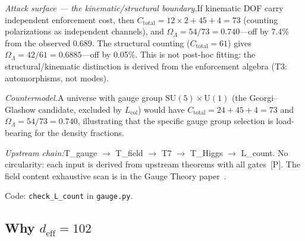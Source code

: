 \documentclass[11pt]{article}
\newcommand{\Ctot}{C_{\mathrm{total}}}
\newcommand{\OmL}{\Omega_\Lambda}
\newcommand{\Lcol}{L_{\mathrm{col}}}
\newcommand{\SU}{\mathrm{SU}}
\newcommand{\U}{\mathrm{U}}
\begin{document}
\textit{Attack surface --- the kinematic/structural boundary.}\quad If kinematic DOF carry independent enforcement cost, then $\Ctot = 12 \times 2 + 45 + 4 = 73$ (counting polarizations as independent channels), and $\OmL = 54/73 = 0.740$---off by 7.4\% from the observed 0.689.  The structural counting ($\Ctot = 61$) gives $\OmL = 42/61 = 0.6885$---off by 0.05\%.  This is not post-hoc fitting: the structural/kinematic distinction is derived from the enforcement algebra (T3: automorphisms, not modes).

\textit{Countermodel.}\quad A universe with gauge group $\SU(5) \times \U(1)$ (the Georgi--Glashow candidate, excluded by $\Lcol$) would have $\Ctot = 24 + 45 + 4 = 73$ and $\OmL = 54/73 = 0.740$, illustrating that the specific gauge group selection is load-bearing for the density fractions.

\textit{Upstream chain:}\quad T\_gauge $\to$ T\_field $\to$ T7 $\to$ T\_Higgs $\to$ L\_count.  No circularity: each input is derived from upstream theorems with all gates~[P].  The field content exhaustive scan is in the Gauge Theory paper~\cite{PGT}.

Code: \texttt{check\_L\_count} in \texttt{gauge.py}.


\subsection{Why \texorpdfstring{$d_{\mathrm{eff}} = 102$}{deff = 102}}
\end{document}
